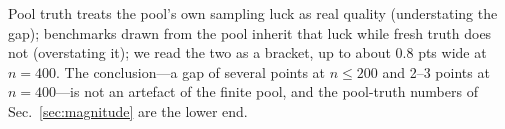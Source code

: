 Pool truth treats the pool's own sampling luck as real quality (understating the gap); benchmarks drawn from the pool inherit that luck while fresh truth does not (overstating it); we read the two as a bracket, up to about 0.8 pts wide at $n{=}400$. The conclusion---a gap of several points at $n\le200$ and 2--3 points at $n{=}400$---is not an artefact of the finite pool, and the pool-truth numbers of Sec.~\ref{sec:magnitude} are the lower end.
